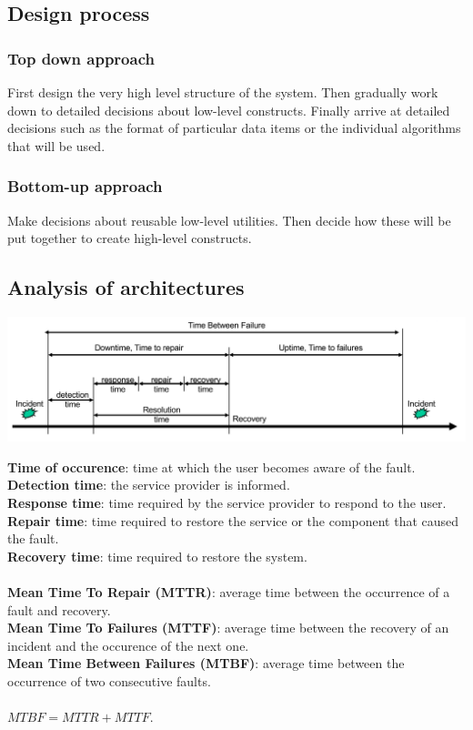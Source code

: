 \subsection{Design process}
\subsubsection{Top down approach}
First design the very high level structure of the system.
Then gradually work down to detailed decisions about low-level constructs. Finally arrive at detailed decisions such as the format of particular data items or the individual algorithms that will be used.

\subsubsection{Bottom-up approach}
Make decisions about reusable low-level utilities.
Then decide how these will be put together to create high-level constructs.

\subsection{Analysis of architectures}
\begin{minipage}{0.4\linewidth}
\includegraphics[angle=90, origin=c, width=\linewidth]{6-design/lifecycle-failure.png}
\end{minipage}
\begin{minipage}{0.58\linewidth}
\textbf{Time of occurence}: time at which the user becomes aware of the fault.\\
\textbf{Detection time}: the service provider is informed.\\
\textbf{Response time}: time required by the service provider to respond to the user.\\
\textbf{Repair time}: time required to restore the service or the component that caused the fault.\\
\textbf{Recovery time}: time required to restore the system.\\ \\
\textbf{Mean Time To Repair (MTTR)}: average time between the occurrence of a fault and recovery.\\
\textbf{Mean Time To Failures (MTTF)}: average time between the recovery of an incident and the occurence of the next one.\\
\textbf{Mean Time Between Failures (MTBF)}: average time between the occurrence of two consecutive faults.\\ \\

$MTBF = MTTR + MTTF$.
\end{minipage}

